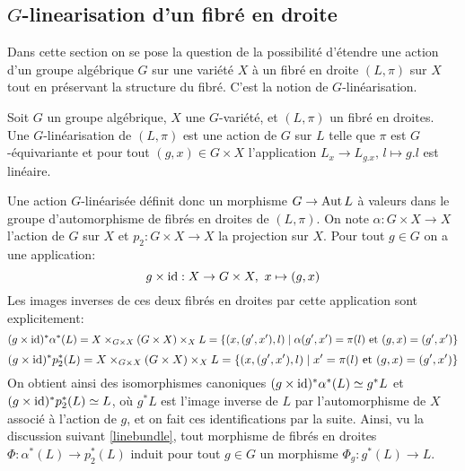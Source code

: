 \subsection{$G$-linearisation d'un fibré en droite}

Dans cette section on se pose la question de la possibilité d'étendre une action d'un groupe algébrique $G$ sur une variété $X$ à un fibré en droite $(L,\pi)$ sur $X$ tout en préservant la structure du fibré. C'est la notion de $G$-linéarisation. 

\begin{defn}
Soit $G$ un groupe algébrique, $X$ une $G$-variété, et $(L,\pi)$ un fibré en droites. Une $G$-linéarisation de  $(L,\pi)$ est une action de $G$ sur $L$ telle que $\pi$ est $G$-équivariante et pour tout $(g,x)\in G\times X$ l'application $L_x\rightarrow L_{g.x},\, l\mapsto g.l$ est linéaire.
\end{defn}

Une action $G$-linéarisée définit donc un morphisme $G\rightarrow \operatorname{Aut} L$ à valeurs dans le groupe d'automorphisme de fibrés en droites de $(L,\pi)$. On note $\alpha: G\times X\rightarrow X$ l'action de $G$ sur $X$ et $p_2:G\times X\rightarrow X$ la projection sur $X$. Pour tout $g\in G$ on a une application:
$$g\times \operatorname{id}: X\rightarrow G\times X,\,\, x\mapsto (g,x)$$ 
Les images inverses de ces deux fibrés en droites par cette application sont explicitement: 
$$(g\times \operatorname{id})^*\alpha^*(L)=X\times_{G\times X}(G\times X)\times_X L=\lbrace (x,(g',x'),l)\mid \alpha(g',x')=\pi(l)\text{ et } (g,x)=(g',x')\rbrace$$
$$(g\times \operatorname{id})^*p_2^*(L)=X\times_{G\times X}(G\times X)\times_X L=\lbrace (x,(g',x'),l)\mid x'=\pi(l)\text{ et } (g,x)=(g',x')\rbrace$$
On obtient ainsi des isomorphismes canoniques $(g\times \operatorname{id})^*\alpha^*(L)\simeq g^*L$ et $(g\times \operatorname{id})^*p_2^*(L)\simeq L$, où $g^*L$ est l'image inverse de $L$ par l'automorphisme de $X$ associé à l'action de $g$, et on fait ces identifications par la suite. Ainsi, vu la discussion suivant \ref{linebundle}, tout morphisme de fibrés en droites $\Phi: \alpha^*(L)\rightarrow p_2^*(L)$ induit pour tout $g\in G$ un morphisme $\Phi_g:g^*(L)\rightarrow L$.


